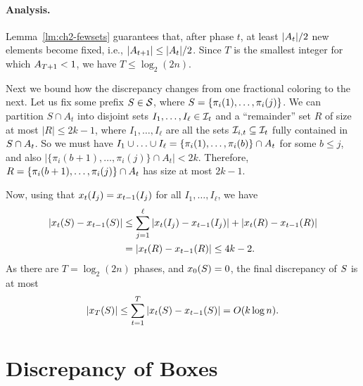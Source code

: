 

\paragraph{Analysis.} Lemma~\ref{lm:ch2-fewsets} guarantees that, after phase $t$, at least $|A_t|/2$ new elements become fixed, i.e., $|A_{t+1}| \le |A_t|/2$. Since $T$ is the smallest integer for which $A_{T+1} < 1$, we have $T \le \log_2(2n)$. 

Next we bound how the discrepancy changes from one fractional coloring to the next. Let us fix some prefix \(S \in \mathcal{S}\), where $S = \{\pi_i(1), \ldots, \pi_i(j)\}$. We can partition $S \cap A_t$ into disjoint sets $I_1, \ldots, I_\ell \in \mathcal{I}_{t}$ and a ``remainder'' set $R$ of size at most $|R| \le 2k-1$, where $I_1, \ldots, I_\ell$ are all the sets $\mathcal{I}_{i,t} \subseteq \mathcal{I}_t$ fully contained in $S\cap A_t$. So we must have $I_1 \cup \ldots \cup I_\ell = \{\pi_i(1), \ldots, \pi_i(b)\} \cap A_t$ for some $b \le j$, and also $|\{\pi_i(b+1), \ldots, \pi_i(j)\} \cap A_t| < 2k$.
Therefore, $R = \{\pi_i(b+1), \ldots, \pi_i(j)\}\cap A_t$ has size at most $2k-1$.

Now, using that \(x_t(I_j) = x_{t-1}(I_j)\) for all \(I_1, \ldots, I_\ell\), we have
\begin{align}
    \left|x_t(S) - x_{t-1}(S)\right|
    &\le \sum_{j = 1}^\ell|x_t(I_j) -  x_{t-1}(I_j)|+ |x_t(R) - x_{t-1}(R)|\notag\\
    &= |x_t(R) - x_{t-1}(R)| \le 4k-2.\label{eq:ch2-perm-dchange}
\end{align}
As there are $T=\log_2(2n)$ phases,
and \(x_0(S) = 0\), 
the
final discrepancy of \(S\) is at most 
\[ |x_T(S)| \le \sum_{t = 1}^T \left|x_t(S) - x_{t-1}(S)\right|  = O(k\log n).\]
%

\section{Discrepancy of Boxes}
\label{sec:ch2-tusnady}

